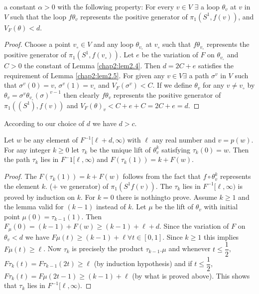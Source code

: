 \begin{lemma}\label{chap2:lem2.5}%
a constant $ \alpha > 0 $ with the following property: For every $v
\in V$ $\exists$ a loop $\theta _{v}$ at $v$ in $V$ such that the
loop $f \theta _{v}$ represents the positive generator of $ \pi_{1}
(S^{1}, f(v))$, and $V_F (\theta )< d$.  
\end{lemma}

\begin{proof}
Choose a point $v_\circ \in V$ and any loop $\theta_{v_\circ}$ at $v_\circ$
such that $f \theta_{v_\circ}$ represents the positive generator of
$\pi_1 (S^1, f(v_\circ))$. Let $e$ be the variation of $F$ on
$\theta_{v_\circ}$ and $C > 0$ the constant of Lemma \ref{chap2:lem2.4}. Then $d = 2C
+ e$ satisfies the requirement of Lemma \ref{chap2:lem2.5}. For given any $v \in V
\exists$ a path $\sigma^{v}$ in $V$ such that $\sigma^{v}(0) = v$,
$\sigma^{v}(1) = v_\circ$ and $V_{F} (\sigma^{v}) < C$. If we define
$\theta _{v}$ for any $v \neq v_\circ$ by $\theta _{v} = \sigma^{v}
\theta_{v_\circ} (\sigma )^{v-1}$ then clearly  
$ f{\theta}_{v}$ represents the positive  generator of $\pi_{1}
((S^{1}), f(v))$ and $V_{F}(\theta )_{v} < C + e + C = 2C + e = d$. 
\end{proof}

According to our choice of $d$ we have $d > c$.

\begin{lemma}\label{chap2:lem2.6}%
Let $w$ be any element of $F^{-1} [\ell + d, \infty)$ with $\ell$ any
  real number and $v = p (w)$.  For any integer $k \geq 0$ let
  $\tau_{k}$ be the unique lift of $\theta^{k}_{v}$ satisfying
  $\tau_{k}(0) = w$. Then the path $\tau_{k}$ lies in
  $F^-1[\ell,\infty)$ and $F (\tau_{k}(1)) = k + F (w)$. 
\end{lemma}

\begin{proof}
The $ F(\tau_{k}(1)) = k+F(w)$ follows from the fact that $f \circ
\theta^{k}_{v}$ represents the element $k.$ ($+$ ve generator) of
$\pi_{1}(S^{1} f(v))$. The $\tau _{k}$ lies in $F^{-1}[\ell, \infty)$
  is proved by induction on $k$. For $k = 0$ there is
  nothing\pageoriginale to prove. Assume $k \geq 1$ and the lemma
  valid for $(k - 1)$ instead of $k$. Let $\mu$ be the lift of
  $\theta_{v}$ with initial point $\mu (0) = \tau_{k-1}(1)$. Then
  $F_{\mu}(0) = (k-1) + F(w) \geq (k-1) + \ell + d$. Since the
  variation of $F$ on $\theta_{v} < d$ we have $F \mu (t)\geq (k-1) +
  \ell \forall t \in [0, 1]$. Since $k \geq 1$ this implies  $F \mu
  (t)\geq \ell$. Now $ \tau_{k}$ is precisely the product
  $\tau_{k-1}. \mu$ and whenever $t \leq \dfrac{1}{2}$, $F \tau_{k}
  (t) = F \tau_{k-1} (2t) \geq \ell$ (by induction hypothesis) and if
  $t \leq \dfrac{1}{2}$, $F \tau_{k}(t) = F \mu (2t-1) \geq (k-1) +
  \ell$ (by what is proved above). This shows that $\tau_{k}$ lies in 
  $F^{-1} [\ell, \infty)$. 
\end{proof}

